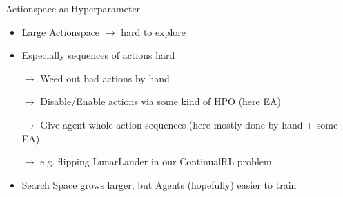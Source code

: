 \documentclass[12pt]{beamer}
\begin{document}
\begin{frame}{Actionspace as Hyperparameter}
  \begin{itemize}
    \item Large Actionspace $\rightarrow$ hard to explore
    \item Especially sequences of actions hard
    \pause
    \item[$\rightarrow$] Weed out bad actions by hand
    \item[$\rightarrow$] Disable/Enable actions via some kind of HPO \parencite{evolving_population} (here EA)
    \item[$\rightarrow$] Give agent whole action-sequences \parencite{action_sequences} (here mostly done by hand + some EA)
    \item[$\rightarrow$] e.g. flipping LunarLander in our ContinualRL problem
    \pause
    \item Search Space grows larger, but Agents (hopefully) easier to train
  \end{itemize}
\end{frame}
\end{document}
